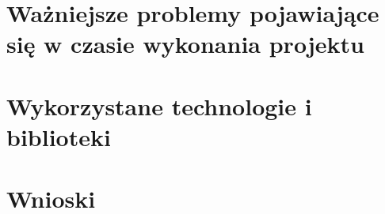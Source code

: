 \documentclass[12pt,a4paper,titlepage]{article}
\begin{document}
\section[Problemy]{Ważniejsze problemy pojawiające się w czasie wykonania projektu}
\section{Wykorzystane technologie i biblioteki}
\section{Wnioski}
\end{document}
